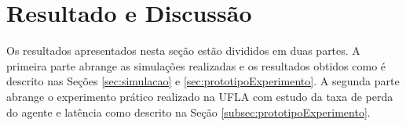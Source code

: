 \section{Resultado e Discussão}
\label{sec:resultados}

Os resultados apresentados nesta seção estão divididos em duas partes. A primeira parte abrange as simulações realizadas e os resultados obtidos como é descrito nas Seções \ref{sec:simulacao} e \ref{sec:prototipoExperimento}. A segunda parte abrange o experimento prático realizado na UFLA com estudo da taxa de perda do agente e latência como descrito na Seção \ref{subsec:prototipoExperimento}. 



